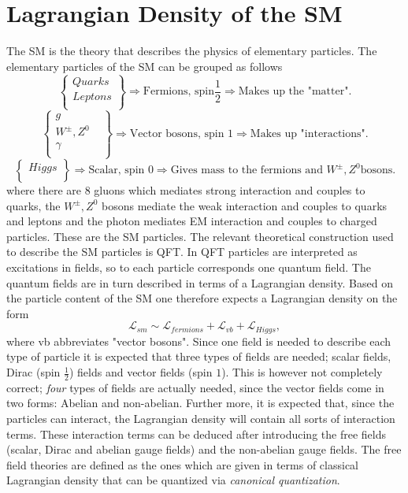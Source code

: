 \chapter{Lagrangian Density of the SM}
The SM is the theory that describes the physics of elementary particles. The elementary particles of the SM can be grouped as follows
\begin{equation}
	\left.
	\begin{cases}
		Quarks\\
		Leptons\\
	\end{cases}\right \}\Rightarrow \text{Fermions, spin}\frac{1}{2}\Rightarrow\text{Makes up the "matter".}
\end{equation} 
\begin{equation}
	\left.
	\begin{cases}
		g & \\
		W^{\pm}, Z^0 \\
		\gamma & \\
	\end{cases}\right \}\Rightarrow \text{Vector bosons, spin 1}\Rightarrow \text{Makes up "interactions".}
\end{equation} 
\begin{equation}
	\left.
	\begin{cases}
		Higgs\\
	\end{cases}\right \}\Rightarrow \text{Scalar, spin 0}\Rightarrow\text{Gives mass to the fermions and } W^{\pm}, Z^0 \text{bosons.}
\end{equation} 
where there are 8 gluons which mediates strong interaction and couples to quarks, the $W^{\pm}, Z^0$ bosons mediate the weak interaction and couples to quarks and leptons and the photon mediates EM interaction and couples to charged particles. These are the SM particles. The relevant theoretical construction used to describe the SM particles is QFT. In QFT particles are interpreted as excitations in fields, so to each particle corresponds one quantum field. The quantum fields are in turn described in terms of a Lagrangian density. Based on the particle content of the SM one therefore expects a Lagrangian density on the form
\begin{equation}
	\mathcal{L}_{sm}\sim \mathcal{L}_{fermions}+\mathcal{L}_{vb}+\mathcal{L}_{Higgs},
	\label{SM lag}
\end{equation} 
where vb abbreviates "vector bosons". Since one field is needed to describe each type of particle it is expected that three types of fields are needed; scalar fields, Dirac (spin $\frac{1}{2}$) fields and vector fields (spin $1$). This is however not completely correct; \emph{four} types of fields are actually needed, since the vector fields come in two forms: Abelian and non-abelian. Further more, it is expected that, since the particles can interact, the Lagrangian density will contain all sorts of interaction terms. These interaction terms can be deduced after introducing the free fields (scalar, Dirac and abelian gauge fields) and the non-abelian gauge fields. The free field theories are defined as the ones which are given in terms of classical Lagrangian density that can be quantized via \emph{canonical quantization}. 

